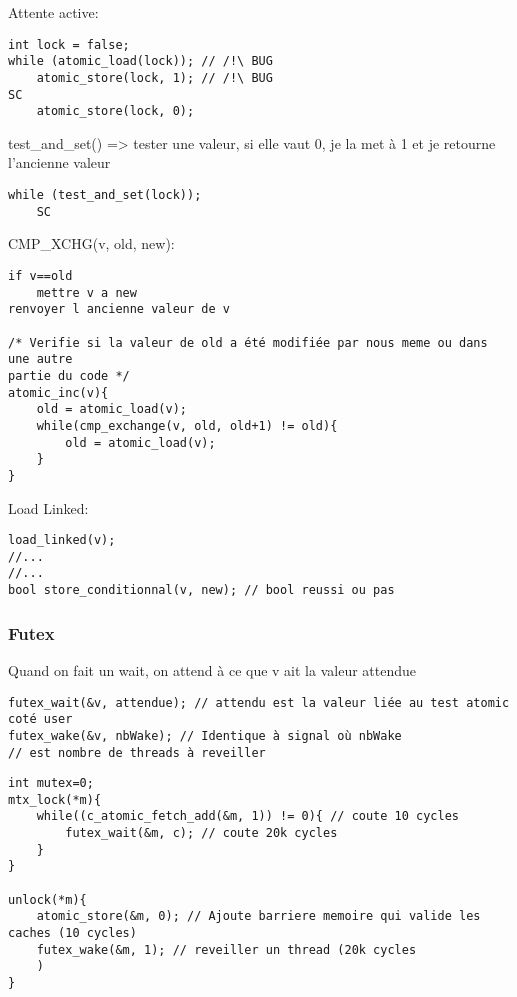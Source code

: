 \documentclass[11pt]{article}
\begin{document}
Attente active:
\begin{verbatim}
int lock = false;
while (atomic_load(lock)); // /!\ BUG
    atomic_store(lock, 1); // /!\ BUG
SC
    atomic_store(lock, 0);
\end{verbatim}

\pagebreak

test\_and\_set() => tester une valeur, si elle vaut 0, je la met à 1 et je retourne l'ancienne valeur
\begin{verbatim}
while (test_and_set(lock));
    SC
\end{verbatim}

CMP\_XCHG(v, old, new):
\begin{verbatim}
if v==old
    mettre v a new
renvoyer l ancienne valeur de v

/* Verifie si la valeur de old a été modifiée par nous meme ou dans une autre 
partie du code */
atomic_inc(v){
    old = atomic_load(v);
    while(cmp_exchange(v, old, old+1) != old){
        old = atomic_load(v);
    }
}
\end{verbatim}

Load Linked:
\begin{verbatim}
load_linked(v);
//...
//...    
bool store_conditionnal(v, new); // bool reussi ou pas

\end{verbatim}

\pagebreak

\subsubsection{Futex}

Quand on fait un wait, on attend à ce que v ait la valeur attendue
\begin{verbatim}
futex_wait(&v, attendue); // attendu est la valeur liée au test atomic coté user
futex_wake(&v, nbWake); // Identique à signal où nbWake 
// est nombre de threads à reveiller
\end{verbatim}

\begin{verbatim}
int mutex=0;
mtx_lock(*m){
    while((c_atomic_fetch_add(&m, 1)) != 0){ // coute 10 cycles
        futex_wait(&m, c); // coute 20k cycles
    }
}

unlock(*m){
    atomic_store(&m, 0); // Ajoute barriere memoire qui valide les caches (10 cycles)
    futex_wake(&m, 1); // reveiller un thread (20k cycles
    )
}

\end{verbatim}
\end{document}
